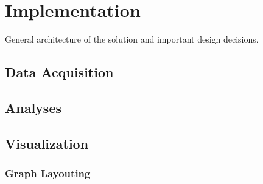 \chapter{Implementation}
\label{c:implementation}

General architecture of the solution and important design decisions.

\section{Data Acquisition}

\section{Analyses}

\section{Visualization}
\subsection{Graph Layouting}